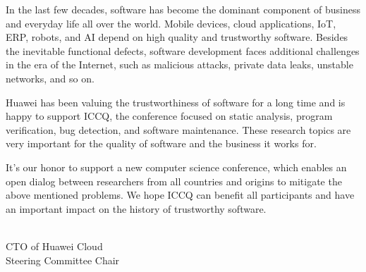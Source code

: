 \clearpage
{}

In the last few decades, software has become the dominant component of business and everyday life all over the world. Mobile devices, cloud applications, IoT, ERP, robots, and AI depend on high quality and trustworthy software. Besides the inevitable functional defects, software development faces additional challenges in the era of the Internet, such as malicious attacks, private data leaks, unstable networks, and so on.

Huawei has been valuing the trustworthiness of software for a long time and is happy to support ICCQ, the conference focused on static analysis, program verification, bug detection, and software maintenance. These research topics are very important for the quality of software and the business it works for.

It's our honor to support a new computer science conference, which enables an open dialog between researchers from all countries and origins to mitigate the above mentioned problems. We hope ICCQ can benefit all participants and have an important impact on the history of trustworthy software.

 \\
CTO of Huawei Cloud \\
Steering Committee Chair
